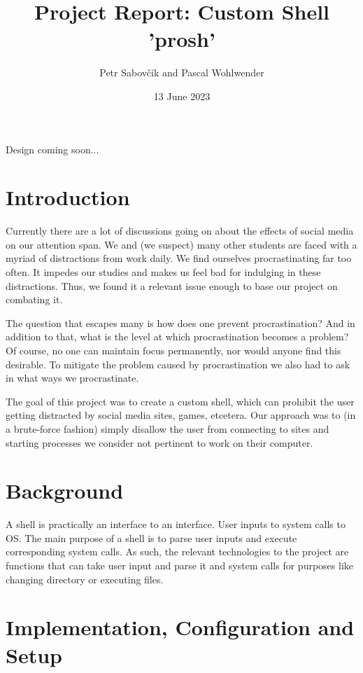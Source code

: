 \documentclass{article}
\title{Project Report: Custom Shell 'prosh'}
\date{13 June 2023}
\author{Petr Sabovčik and Pascal Wohlwender}
\begin{document}
\begin{titlepage}
	\maketitle
	Design coming soon...
\end{titlepage}

\tableofcontents
\pagebreak

\section{Introduction}

Currently there are a lot of discussions going on about the effects of social media on our attention span. We and (we suspect) many other students are faced with a myriad of distractions from work daily. We find ourselves procrastinating far too often. It impedes our studies and makes us feel bad for indulging in these distractions. Thus, we found it a relevant issue enough to base our project on combating it. 

The question that escapes many is how does one prevent procrastination? And in addition to that, what is the level at which procrastination becomes a problem? Of course, no one can maintain focus permanently, nor would anyone find this desirable. To mitigate the problem caused by procrastination we also had to ask in what ways we procrastinate. 

The goal of this project was to create a custom shell, which can prohibit the user getting distracted by social media sites, games, etcetera. Our approach was to (in a brute-force fashion) simply disallow the user from connecting to sites and starting processes we consider not pertinent to work on their computer. 


\section{Background}

A shell is practically an interface to an interface. User inputs to system calls to OS. The main purpose of a shell is to parse user inputs and execute corresponding system calls. As such, the relevant technologies to the project are functions that can take user input and parse it and system calls for purposes like changing directory or executing files.

\section{Implementation, Configuration and Setup}
\end{document}
